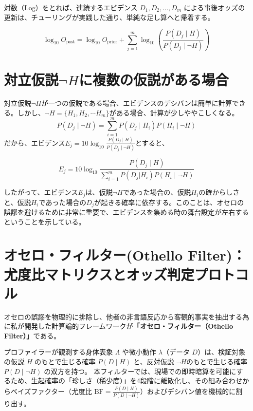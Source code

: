 対数（Log）をとれば、連続するエビデンス $D_1, D_2, \dots, D_m$ による事後オッズの更新は、チューリングが実践した通り、単純な足し算へと帰着する。

\begin{equation}
\log_{10} O_{\mathrm{post}} = \log_{10} O_{\mathrm{prior}} + \sum_{j=1}^m \log_{10} \left( \frac{P(D_j \mid H)}{P(D_j \mid \neg H)} \right)
\label{eq:turing_log_odds}
\end{equation}

\section{対立仮説$\neg H$に複数の仮説がある場合}
対立仮説$\neg H$が一つの仮説である場合、エビデンスのデシバンは簡単に計算できる。しかし、$\neg H = \{H_1, H_2, \cdots H_m \}$がある場合、計算が少しややこしくなる。
\begin{equation}
    P( D_j \mid \neg H) = \sum^m_{i = 1} P( D_j \mid H_i)P(H_i \mid \neg H)
\end{equation}
だから、エビデンス$E_j = 10 \log_{10} \frac{P(D_j \mid H)}{P(D_j \mid \neg H)}$とすると、

\begin{equation}
    E_j = 10 \log_{10} \frac{P(D_j \mid H)}{\sum^m_{i = 1} P(D_j | H_i) P( H_i \mid \neg H)}
\end{equation}

したがって、エビデンス$E_j$は、仮説$\neg H$であった場合の、仮説$H_i$の確からしさと、仮説$H_i$であった場合の$D_j$が起きる確率に依存する。このことは、オセロの誤謬を避けるために非常に重要で、エビデンスを集める時の舞台設定が左右するということを示している。


\section{オセロ・フィルター(Othello Filter\texttrademark )：尤度比マトリクスとオッズ判定プロトコル}

オセロの誤謬を物理的に排除し、他者の非言語反応から客観的事実を抽出する為に私が開発した計算論的フレームワークが\textbf{「オセロ・フィルター（Othello Filter\texttrademark ）」}である。

プロファイラーが観測する身体表象 $\Lambda$ や微小動作 $\lambda$（データ $D$）は、検証対象の仮説 $H$ のもとで生じる確率 $P(D \mid H)$ と、反対仮説 $\neg H$のもとで生じる確率 $P(D \mid \neg H)$ の双方を持つ。
本フィルターでは、現場での即時暗算を可能にするため、生起確率の「珍しさ（稀少度）」を4段階に離散化し、その組み合わせからベイズファクター（尤度比 $\mathrm{BF} = \frac{P(D \mid H)}{P(D \mid \neg H)}$）およびデシバン値を機械的に割り出す。


